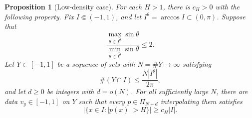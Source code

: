 \documentclass[11pt]{article}
\newtheorem{proposition}[theorem]{Proposition}
\theoremstyle{definition}
\numberwithin{equation}{section}
\begin{document}
\begin{proposition}[Low-density case]\label{prop:sparse}
For each \(H>1\), there is \(c_H>0\) with the following property.
Fix \(I\Subset(-1,1)\), and let \(I^\theta=\arccos I\subset(0,\pi)\).
Suppose that
\[
 \frac{\max_{\theta\in\overline{I^\theta}}\sin\theta}
      {\min_{\theta\in\overline{I^\theta}}\sin\theta}\le2.
\]
Let \(Y\subset[-1,1]\) be a sequence of sets with \(N=\#Y\to\infty\)
satisfying
\begin{equation}\label{eq:sparse-count}
 \#(Y\cap I)\le\frac{N|I^\theta|}{2\pi},
\end{equation}
and let \(d\ge0\) be integers with \(d=o(N)\).
For all sufficiently large \(N\), there are data \(v_y\in[-1,1]\)
on \(Y\) such that every \(p\in\Pi_{N+d}\) interpolating them satisfies
\begin{equation}\label{eq:sparse-amplification}
 |\{x\in I:|p(x)|>H\}|\ge c_H|I|.
\end{equation}
\end{proposition}
\end{document}
